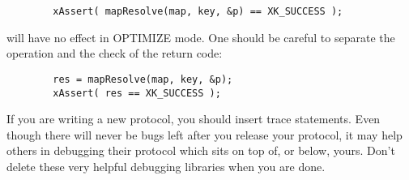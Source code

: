 \begin{verbatim}
        xAssert( mapResolve(map, key, &p) == XK_SUCCESS );
\end{verbatim}

\noindent
will have no effect in OPTIMIZE mode.  One should be careful to
separate the operation and the check of the return code:

\begin{verbatim}
        res = mapResolve(map, key, &p);
        xAssert( res == XK_SUCCESS );
\end{verbatim}


If you are writing a new protocol, you should insert trace
statements. Even though there will never be bugs left after you
release your protocol, it may help others in debugging their protocol
which sits on top of, or below, yours. Don't delete these very helpful
debugging libraries when you are done.
